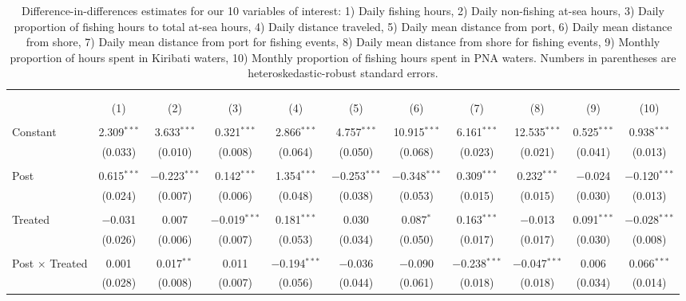 
\begin{table}[!htbp] \centering 
  \caption{\label{tab:main_DID}Difference-in-differences estimates for our 10 variables of interest: 1) Daily fishing hours, 2) Daily non-fishing at-sea hours, 3) Daily proportion of fishing hours to total at-sea hours, 4) Daily distance traveled, 5) Daily mean distance from port, 6) Daily mean distance from shore, 7) Daily mean distance from port for fishing events, 8) Daily mean distance from shore for fishing events, 9) Monthly proportion of hours spent in Kiribati waters, 10) Monthly proportion of fishing hours spent in PNA waters. Numbers in parentheses are heteroskedastic-robust standard errors.} 
  \label{} 
\footnotesize 
\begin{tabular}{@{\extracolsep{1pt}}lcccccccccc} 
\\[-1.8ex]\hline 
\hline \\[-1.8ex] 
\\[-1.8ex] & (1) & (2) & (3) & (4) & (5) & (6) & (7) & (8) & (9) & (10)\\ 
\hline \\[-1.8ex] 
 Constant & 2.309$^{***}$ & 3.633$^{***}$ & 0.321$^{***}$ & 2.866$^{***}$ & 4.757$^{***}$ & 10.915$^{***}$ & 6.161$^{***}$ & 12.535$^{***}$ & 0.525$^{***}$ & 0.938$^{***}$ \\ 
  & (0.033) & (0.010) & (0.008) & (0.064) & (0.050) & (0.068) & (0.023) & (0.021) & (0.041) & (0.013) \\ 
  & & & & & & & & & & \\ 
 Post & 0.615$^{***}$ & $-$0.223$^{***}$ & 0.142$^{***}$ & 1.354$^{***}$ & $-$0.253$^{***}$ & $-$0.348$^{***}$ & 0.309$^{***}$ & 0.232$^{***}$ & $-$0.024 & $-$0.120$^{***}$ \\ 
  & (0.024) & (0.007) & (0.006) & (0.048) & (0.038) & (0.053) & (0.015) & (0.015) & (0.030) & (0.013) \\ 
  & & & & & & & & & & \\ 
 Treated & $-$0.031 & 0.007 & $-$0.019$^{***}$ & 0.181$^{***}$ & 0.030 & 0.087$^{*}$ & 0.163$^{***}$ & $-$0.013 & 0.091$^{***}$ & $-$0.028$^{***}$ \\ 
  & (0.026) & (0.006) & (0.007) & (0.053) & (0.034) & (0.050) & (0.017) & (0.017) & (0.030) & (0.008) \\ 
  & & & & & & & & & & \\ 
 Post $\times$ Treated & 0.001 & 0.017$^{**}$ & 0.011 & $-$0.194$^{***}$ & $-$0.036 & $-$0.090 & $-$0.238$^{***}$ & $-$0.047$^{***}$ & 0.006 & 0.066$^{***}$ \\ 
  & (0.028) & (0.008) & (0.007) & (0.056) & (0.044) & (0.061) & (0.018) & (0.018) & (0.034) & (0.014) \\ 

\end{tabular}
\end{table}
